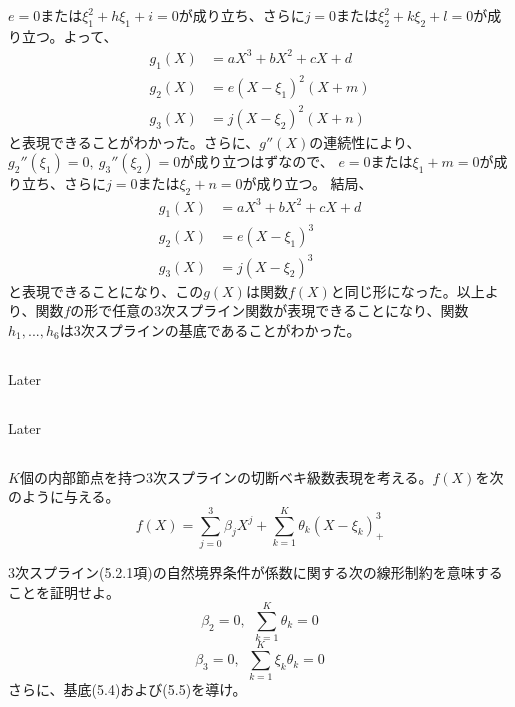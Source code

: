 \documentclass{jsarticle}
\begin{document}
$e=0$または$\xi_1^2+h\xi_1+i=0$が成り立ち、さらに$j=0$または$\xi_2^2+k\xi_2+l=0$が成り立つ。よって、
\begin{align*}
g_1(X)&=a X^3+ b X^2 + c X + d\\
g_2(X)&=e (X-\xi_1)^2(X + m) \\
g_3(X)&=j (X-\xi_2)^2(X + n)
\end{align*}
と表現できることがわかった。さらに、$g''(X)$の連続性により、$g_2''(\xi_1)=0,\ g_3''(\xi_2)=0$が成り立つはずなので、
$e=0$または$\xi_1+m=0$が成り立ち、さらに$j=0$または$\xi_2+n=0$が成り立つ。
結局、
\begin{align*}
g_1(X)&=a X^3+ b X^2 + c X + d\\
g_2(X)&=e (X-\xi_1)^3 \\
g_3(X)&=j (X-\xi_2)^3
\end{align*}
と表現できることになり、この$g(X)$は関数$f(X)$と同じ形になった。以上より、関数$f$の形で任意の3次スプライン関数が表現できることになり、関数$h_1,...,h_6$は3次スプラインの基底であることがわかった。




\subsection{}
Later


\subsection{}
Later




\subsection{}
\begin{shadebox}
$K$個の内部節点を持つ3次スプラインの切断ベキ級数表現を考える。$f(X)$を次のように与える。
\[f(X)=\sum_{j=0}^3 \beta_j X^j + \sum_{k=1}^{K}\theta_k(X-\xi_k)_+^3\]

3次スプライン(5.2.1項)の自然境界条件が係数に関する次の線形制約を意味することを証明せよ。
\[\beta_2=0,\ \ \sum_{k=1}^{K}\theta_k=0\]
\[\beta_3=0,\ \ \sum_{k=1}^{K}\xi_k\theta_k=0\]
さらに、基底(5.4)および(5.5)を導け。
\end{shadebox}
\end{document}
